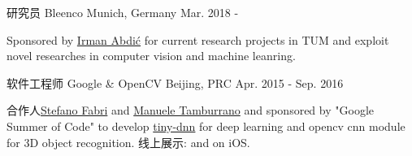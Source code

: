 


\begin{cventries}


\cventry
{研究员} %
{Bleenco} %
{Munich, Germany} %
{Mar. 2018 - } %
{ %
\begin{cvitems}
\item {Sponsored by \href{https://www.linkedin.com/in/irmanabdic/?originalSubdomain=de}{Irman Abdić} for current research projects in TUM and exploit novel researches in computer vision and machine leanring.}
\end{cvitems}
}

\cventry
{软件工程师} %
{Google \& OpenCV} %
{Beijing, PRC} %
{Apr. 2015 - Sep. 2016} %
{ %
\begin{cvitems}
\item {合作人\href{https://www.linkedin.com/in/stefano-fabri-16a73748}{Stefano Fabri} and \href{https://www.linkedin.com/in/manuele-tamburrano-b82384a5?authType=name&authToken=Di5p&trk=prof-sb-browse_map-name}{Manuele Tamburrano} and sponsored by "Google Summer of Code" to develop \href{https://github.com/tiny-dnn/tiny-dnn}{tiny-dnn} for deep learning and opencv cnn module for 3D object recognition.
		线上展示: \href{https://www.youtube.com/watch?v=Mc20rTYdXTE}{} and \href{https://drive.google.com/open?id=0B-RYa1FDOrYXVUEzcG1mdnl5a3M}{} on iOS.
}
\end{cvitems}
}


\end{cventries}
